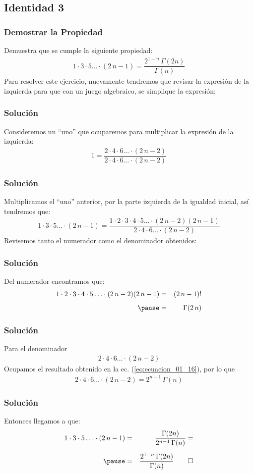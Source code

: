\subsection{Identidad 3}
\begin{frame}
\frametitle{Demostrar la Propiedad}
Demuestra que se cumple la siguiente propiedad:
\begin{align*}
1 \cdot 3 \cdot 5 \ldots \cdot (2 \, n - 1) = \dfrac{2^{1-n} \, \Gamma (2 n)}{\Gamma (n)}
\end{align*}
\pause
Para resolver este ejercicio, nuevamente tendremos que revisar la expresión de la izquierda para que con un juego algebraico, se simplique la expresión:
\end{frame}
\begin{frame}
\frametitle{Solución}
Consideremos un \enquote{uno} que ocuparemos para multiplicar la expresión de la izquierda:
\begin{align*}
1 = \dfrac{ 2 \cdot 4 \cdot 6 \ldots \cdot (2 \, n - 2)}{ 2 \cdot 4 \cdot 6 \ldots \cdot (2 \, n - 2)}
\end{align*}
\end{frame}
\begin{frame}
\frametitle{Solución}
Multiplicamos el \enquote{uno} anterior, por la parte izquierda de la igualdad inicial, así tendremos que:
{\fontsize{12}{12}\selectfont
\begin{align*}
1 \cdot 3 \cdot 5 \ldots \cdot (2 \, n - 1) = \dfrac{1 \cdot 2 \cdot 3 \cdot 4 \cdot 5 \ldots \cdot (2 \, n - 2)(2 \, n -1)}{2 \cdot 4 \cdot 6 \ldots \cdot (2 \, n - 2)}
\end{align*}}
\pause
Revisemos tanto el numerador como el denominador obtenidos:
\end{frame}
\begin{frame}
\frametitle{Solución}
Del numerador encontramos que:
\begin{eqnarray*}
1 \cdot 2 \cdot 3 \cdot 4 \cdot 5 \ldots \cdot (2 \, n - 2)(2 \, n -1) &=& (2 \, n - 1)! \\[0.5em] \pause
&=& \Gamma (2 \, n)
\end{eqnarray*}
\end{frame}
\begin{frame}
\frametitle{Solución}
Para el denominador
\begin{align*}
2 \cdot 4 \cdot 6 \ldots \cdot (2 \, n - 2)
\end{align*}
\pause
Ocupamos el resultado obtenido en la ec. (\ref{eq:ecuacion_01_16}), por lo que
\begin{align*}
2 \cdot 4 \cdot 6 \ldots \cdot (2 \, n - 2) = 2^{n-1} \, \Gamma (n)
\end{align*}
\end{frame}
\begin{frame}
\frametitle{Solución}
Entonces llegamos a que:
\begin{eqnarray*}
1 \cdot 3 \cdot 5 \ldots \cdot (2 \, n - 1) &=& \dfrac{\Gamma (2 n)}{2^{n-1} \, \Gamma (n)} = \\[0.5em] \pause
&=& \dfrac{2^{1-n} \, \Gamma(2n)}{\Gamma (n)} \qed
\end{eqnarray*}
\end{frame}

